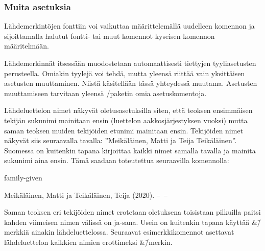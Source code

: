 \begin{koodilohkosis}
  \setlength{\bibitemsep}{.5ex plus .1ex minus .1ex}
  \setlength{\bibnamesep}{1em  plus .2ex minus .1ex}
  \setlength{\bibinitsep}{2em  plus .2ex minus .1ex}
\end{koodilohkosis}

\subsubsection{Muita asetuksia}

Lähdemerkintöjen fonttiin voi vaikuttaa määrittelemällä uudelleen
komennon  ja sijoittamalla halutut fontti- tai muut
komennot kyseisen komennon määritelmään.

\begin{koodilohkosis}
  \renewcommand{\bibfont}{\sffamily\small}
\end{koodilohkosis}

Lähdemerkinnät itsessään muodostetaan automaattisesti tiettyjen
tyyli\-ase\-tus\-ten perusteella. Omiakin tyylejä voi tehdä, mutta
yleensä riittää vain yksittäisen asetusten muuttaminen. Niistä
käsitellään tässä yhteydessä muutama. Asetusten muuttamiseen tarvitaan
yleensä \-/paketin omia asetuskomentoja.

Lähdeluettelon nimet näkyvät oletusasetuksilla siten, että teoksen
ensimmäisen tekijän sukunimi mainitaan ensin (luettelon
aakkosjärjestyksen vuoksi) mutta saman teoksen muiden tekijöiden etunimi
mainitaan ensin. Tekijöiden nimet näkyvät siis seuraavalla tavalla:
''Meikäläinen, Matti ja Teija Teikäläinen''. Suomessa on kuitenkin
tapana kirjoittaa kaikki nimet samalla tavalla ja mainita sukunimi aina
ensin. Tämä saadaan toteutettua seuraavilla komennolla:


\begin{koodilohkosis}
   {family-given}
\end{koodilohkosis}

\begin{tulossis}
  Meikäläinen, Matti ja Teikäläinen, Teija (2020). --~--
\end{tulossis}

Saman teoksen eri tekijöiden nimet erotetaan oletuksena toisistaan
pilkuilla paitsi kahden viimeisen nimen välissä on ja-sana. Usein on
kuitenkin tapana käyttää \&\=/merkkiä ainakin lähdeluettelossa.
Seuraavat esimerkkikomennot asettavat lähdeluettelon kaikkien nimien
erottimeksi \&\=/merkin.

